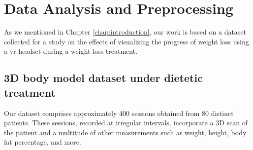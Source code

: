 \chapter{Data Analysis and Preprocessing}\label{chap:data}

As we mentioned in Chapter \ref{chap:introduction}, our work is based on a
dataset collected for a study on the effects of visualizing the progress of
weight loss using a \gls{vr} headset during a weight loss treatment.

\section{3D body model dataset under dietetic treatment}

Our dataset comprises approximately 400 sessions obtained from 80 distinct
patients. These sessions, recorded at irregular intervals, incorporate a 3D
scan of the patient and a multitude of other measurements such as weight,
height, body fat percentage, and more.

